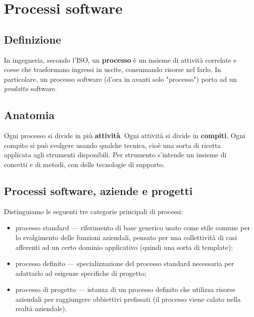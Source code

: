 \documentclass[a4paper]{article}
\begin{document}
		
	\section{Processi software}


		
	\subsection{Definizione}

		
In ingegneria, secondo l'ISO, un \textbf{processo} è un insieme di attività correlate e coese che trasformano ingressi in uscite, consumando risorse nel farlo. In particolare, un processo software (d'ora in avanti solo "processo") porta ad un \emph{prodotto} software.

		
	\subsection{Anatomia}

		
Ogni processo si divide in più \textbf{attività}. Ogni attività si divide in \textbf{compiti}. Ogni compito si può svolgere usando qualche tecnica, cioè una sorta di ricetta applicata agli strumenti disponibili. Per strumento s'intende un insieme di concetti e di metodi, con delle tecnologie di supporto.

		
	\subsection{Processi software, aziende e progetti}

		
Distinguiamo le seguenti tre categorie principali di processi:
		
	\begin{itemize}
		
			
	\item processo standard — riferimento di base generico usato come stile comune per lo svolgimento delle funzioni aziendali, pensato per una collettività di casi afferenti ad un certo dominio applicativo (quindi una sorta di template);
			
	\item processo definito — specializzazione del processo standard necessaria per adattarlo ad esigenze specifiche di progetto;
			
	\item processo di progetto — istanza di un processo definito che utilizza risorse aziendali per raggiungere obbiettivi prefissati (il processo viene calato nella realtà aziendale).
		
	\end{itemize}
\end{document}
